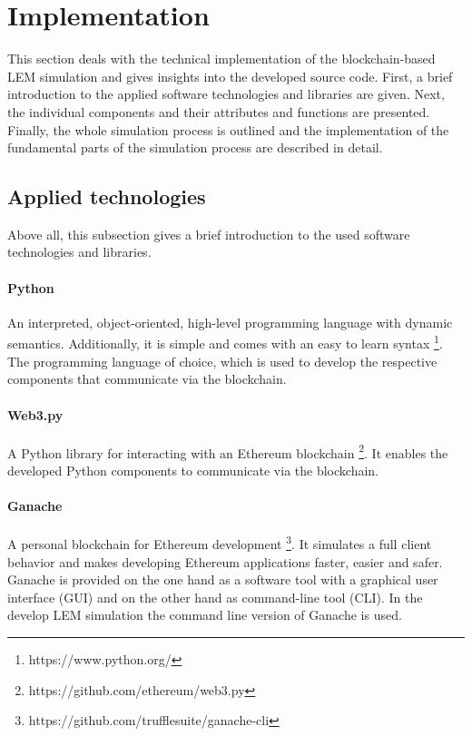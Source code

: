 \section{Implementation}
\label{sec:implementation}

This section deals with the technical implementation of the blockchain-based LEM simulation
and gives insights into the developed source code.
First, a brief introduction to the applied software 
technologies and libraries are given.
Next, the individual components and their attributes and functions are presented. 
Finally, the whole simulation process is outlined and the implementation 
of the fundamental parts of the simulation process are described in detail. 

\subsection{Applied technologies}
\label{sec:applied_technologies}
Above all, this subsection gives a brief introduction 
to the used software technologies and libraries.

\paragraph{Python}
An interpreted, object-oriented, high-level programming language with dynamic semantics. 
Additionally, it is simple and comes with an easy to learn syntax \footnote{https://www.python.org/}.
The programming language of choice, which is used to develop the 
respective components that communicate via the blockchain.

\paragraph{Web3.py}
A Python library for interacting with an Ethereum blockchain \footnote{https://github.com/ethereum/web3.py}. 
It enables the developed Python components to communicate via the blockchain.

\paragraph{Ganache}
A personal blockchain for Ethereum development \footnote{https://github.com/trufflesuite/ganache-cli}.
It simulates a full client behavior and makes developing Ethereum applications faster, easier and safer.
Ganache is provided on the one hand as a software tool with a graphical user interface (GUI) and on the other hand as command-line tool (CLI). In the develop LEM simulation the command line version of Ganache is used. 

